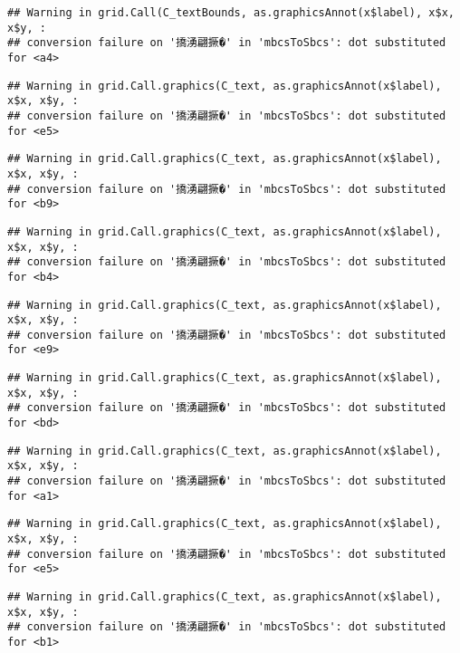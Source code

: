 \documentclass[
]{article}
\begin{document}
\begin{verbatim}
## Warning in grid.Call(C_textBounds, as.graphicsAnnot(x$label), x$x, x$y, :
## conversion failure on '撟湧翩撅�' in 'mbcsToSbcs': dot substituted for <a4>
\end{verbatim}

\begin{verbatim}
## Warning in grid.Call.graphics(C_text, as.graphicsAnnot(x$label), x$x, x$y, :
## conversion failure on '撟湧翩撅�' in 'mbcsToSbcs': dot substituted for <e5>
\end{verbatim}

\begin{verbatim}
## Warning in grid.Call.graphics(C_text, as.graphicsAnnot(x$label), x$x, x$y, :
## conversion failure on '撟湧翩撅�' in 'mbcsToSbcs': dot substituted for <b9>
\end{verbatim}

\begin{verbatim}
## Warning in grid.Call.graphics(C_text, as.graphicsAnnot(x$label), x$x, x$y, :
## conversion failure on '撟湧翩撅�' in 'mbcsToSbcs': dot substituted for <b4>
\end{verbatim}

\begin{verbatim}
## Warning in grid.Call.graphics(C_text, as.graphicsAnnot(x$label), x$x, x$y, :
## conversion failure on '撟湧翩撅�' in 'mbcsToSbcs': dot substituted for <e9>
\end{verbatim}

\begin{verbatim}
## Warning in grid.Call.graphics(C_text, as.graphicsAnnot(x$label), x$x, x$y, :
## conversion failure on '撟湧翩撅�' in 'mbcsToSbcs': dot substituted for <bd>
\end{verbatim}

\begin{verbatim}
## Warning in grid.Call.graphics(C_text, as.graphicsAnnot(x$label), x$x, x$y, :
## conversion failure on '撟湧翩撅�' in 'mbcsToSbcs': dot substituted for <a1>
\end{verbatim}

\begin{verbatim}
## Warning in grid.Call.graphics(C_text, as.graphicsAnnot(x$label), x$x, x$y, :
## conversion failure on '撟湧翩撅�' in 'mbcsToSbcs': dot substituted for <e5>
\end{verbatim}

\begin{verbatim}
## Warning in grid.Call.graphics(C_text, as.graphicsAnnot(x$label), x$x, x$y, :
## conversion failure on '撟湧翩撅�' in 'mbcsToSbcs': dot substituted for <b1>
\end{verbatim}
\end{document}
